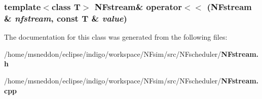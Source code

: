 \subsubsection{\setlength{\rightskip}{0pt plus 5cm}template$<$class T$>$ {\bf NFstream}\& operator$<$$<$ ({\bf NFstream} \& {\em nfstream}, const T \& {\em value})\hspace{0.3cm}{\tt  [friend]}}\label{classNFstream_ef588953052314e1b69285568a59947f}




The documentation for this class was generated from the following files:\begin{CompactItemize}
\item 
/home/msneddon/eclipse/indigo/workspace/NFsim/src/NFscheduler/{\bf NFstream.h}\item 
/home/msneddon/eclipse/indigo/workspace/NFsim/src/NFscheduler/{\bf NFstream.cpp}\end{CompactItemize}
